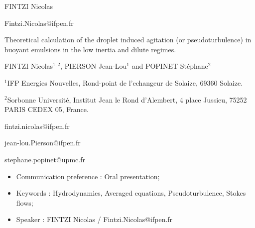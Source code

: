 \documentclass[a4paper,11pt]{article}
\author{\large GAMET Lionel}
\author{\large PIERSON Jean-Lou}
\author{\large GAMET Lionel$^1$, PIERSON Jean-Lou$^2$ and FINTZI Nicolas$^3$}
\theoremstyle{mytheoremstyle}
\theoremstyle{mytheoremstyle}
\theoremstyle{myproblemstyle}
\begin{document}
\begin{flushright}
    FINTZI Nicolas
    
    Fintzi.Nicolas@ifpen.fr
\end{flushright}
\begin{center}
    \vspace{10pt}
    {\Large Theoretical calculation of the droplet induced agitation (or pseudoturbulence) in buoyant emulsions in the low inertia and dilute regimes.}\\
    \vspace{10pt}

    \vspace{15pt}
    {\large FINTZI Nicolas$^{1,2}$, PIERSON Jean-Lou$^1$ and POPINET St\'ephane$^2$}
\end{center}

\begin{flushleft}
$^{1}$\large IFP Energies Nouvelles, Rond-point de l’echangeur de Solaize, 69360 Solaize.

$^{2}$\large Sorbonne Universit\'e, Institut Jean le Rond d'Alembert, 4 place Jussieu, 75252 PARIS CEDEX 05, France.

fintzi.nicolas@ifpen.fr 

jean-lou.Pierson@ifpen.fr

stephane.popinet@upmc.fr


\end{flushleft}
\begin{itemize}
\item Communication preference : Oral presentation;
\item Keywords : Hydrodynamics, Averaged equations, Pseudoturbulence, Stokes flows;
\item Speaker : FINTZI Nicolas / Fintzi.Nicolas@ifpen.fr
\end{itemize}


\vspace{15pt}
\end{document}

